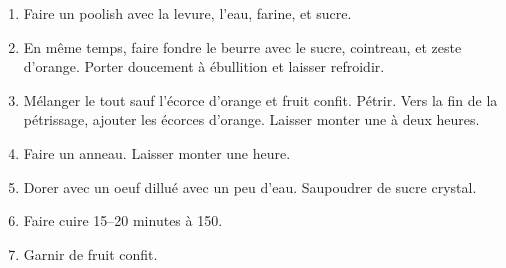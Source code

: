 
\begin{ingredients}
\end{ingredients}


\begin{recipe}
  \begin{enumerate}

  \item Faire un poolish avec la levure, l'eau, farine, et sucre.
    
  \item En même temps, faire fondre le beurre avec le sucre,
    cointreau, et zeste d'orange.  Porter doucement à ébullition et
    laisser refroidir.
    
  \item Mélanger le tout sauf l'écorce d'orange et fruit confit.
    Pétrir.  Vers la fin de la pétrissage, ajouter les écorces
    d'orange.  Laisser monter une à deux heures.

  \item Faire un anneau.  Laisser monter une heure.
    
  \item Dorer avec un oeuf dillué avec un peu d'eau.  Saupoudrer de
    sucre crystal.
    
  \item Faire cuire 15--20 minutes à 150\degreeC.
    
  \item Garnir de fruit confit.

  \end{enumerate}
\end{recipe}

